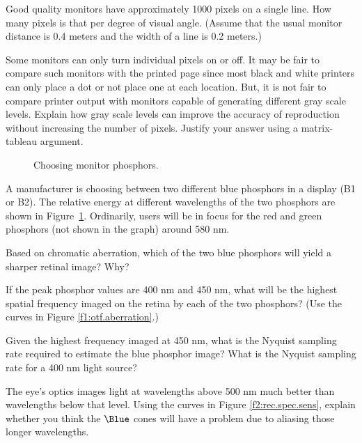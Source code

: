  \item Good quality monitors have approximately 1000 pixels on
a single line.  How many pixels is that per degree of visual angle.
(Assume that the usual monitor distance is 0.4 meters and the
width of a line is 0.2 meters.)
  \item Some monitors can only turn individual pixels on or off.
It may be fair to compare such monitors with the printed page
since most black and white printers can only place a dot or not
place one at each location.
But, it is not fair to compare printer output
with monitors capable of generating different gray scale levels.
Explain how gray scale levels can improve the accuracy of
reproduction without increasing the number of pixels.
Justify your answer using a matrix-tableau argument.
 \ee

\begin{figure}
\centerline{
}
\caption{
Choosing monitor phosphors.
}
\label{f2:bluePhosphors}
\end{figure}
\item A manufacturer is choosing between two different blue
phosphors in a display (B1 or B2).
The relative energy at different wavelengths of the
two phosphors are shown in Figure~\ref{f2:bluePhosphors}.
Ordinarily, users will be in focus for the red and green
phosphors (not shown in the graph) around 580 nm.

 \be

 \item Based on chromatic aberration, 
which of the two blue
phosphors will yield a sharper retinal image? Why?

 \item If the peak phosphor values are 400 nm and 450 nm,
what will be the highest spatial frequency imaged on the retina
by each of the two phosphors?
(Use the curves in Figure \ref{f1:otf.aberration}.)

 \item Given the highest frequency imaged at 450 nm, what is the
Nyquist sampling rate required to estimate the blue phosphor image?
What is the Nyquist sampling rate for a 400 nm light source?

 \item The eye's optics images
light at wavelengths above 500 nm much better than wavelengths
below that level.
Using the curves in Figure \ref{f2:rec.spec.sens},
explain whether you think the $\Blue$ cones 
will have a problem due to aliasing those longer wavelengths.

